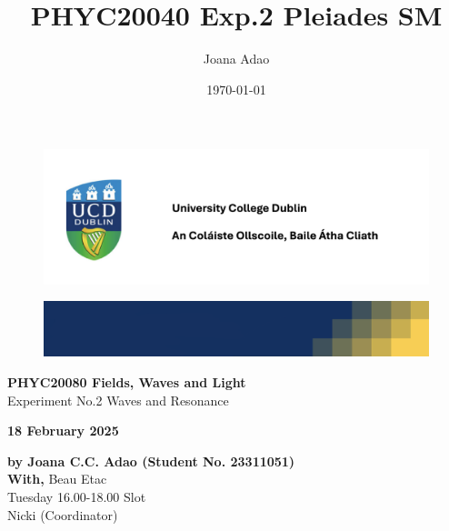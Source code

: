 \documentclass[12pt]{article}
\title{PHYC20040 Exp.2 Pleiades SM}
\author{Joana Adao}
\date{\today}
\begin{document}
\begin{titlepage}
    \begin{center}

        \begin{figure}[ht]
            \includegraphics[width=\textwidth]{UCDLogo.png}
        \end{figure}
        
        \begin{figure}
            \centerline{\includegraphics[width=\paperwidth]{UCDBanner.png}}
        \end{figure}

        \vspace{4cm}

        {\LARGE \bfseries PHYC20080 Fields, Waves and Light}\\
        \vspace{0.75cm}
        {\Large Experiment No.2 Waves and Resonance}
        
        \vspace{1cm}
    
    {\Large \textbf{18 February 2025}}

    \vspace{2cm}
    
    {\large \textbf{by Joana C.C. Adao (Student No. 23311051)}}\\
    \vspace{.25cm}
    {\large \textbf{With,} Beau Etac}\\
    \vspace{0.25cm}
    {\large Tuesday 16.00-18.00 Slot}\\
    {\large Nicki (Coordinator)}

    \end{center}
    
   \clearpage

\end{titlepage}
\end{document}
